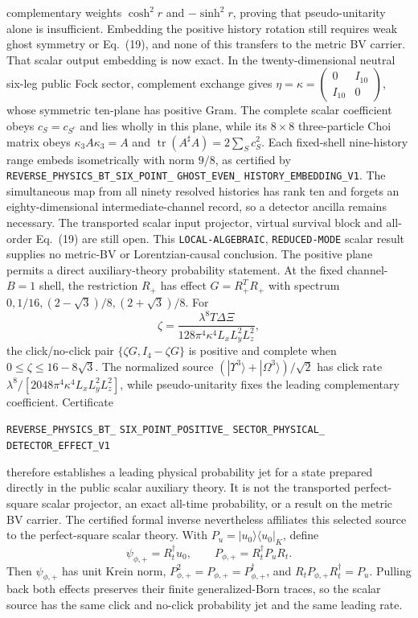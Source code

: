 \documentclass[11pt]{article}
\theoremstyle{definition}
\theoremstyle{remark}
\begin{document}
complementary weights $\cosh^2r$ and $-\sinh^2r$, proving that
pseudo-unitarity alone is insufficient.  Embedding the positive history
rotation still requires weak ghost symmetry or Eq.~(19), and none of this
transfers to the metric BV carrier.
That scalar output embedding is now exact.  In the twenty-dimensional neutral
six-leg public Fock sector, complement exchange gives
\(
\eta=\kappa=\left(\begin{smallmatrix}0&I_{10}\\I_{10}&0\end{smallmatrix}\right)
\), whose symmetric ten-plane has positive Gram.  The complete scalar
coefficient obeys $c_S=c_{S^c}$ and lies wholly in this plane, while its
$8\times8$ three-particle Choi matrix obeys
$\kappa_3A\kappa_3=A$ and
$\operatorname{tr}(A^\sharp A)=2\sum_Sc_S^2$.  Each fixed-shell
nine-history range embeds isometrically with norm $9/8$, as certified by
\texttt{REVERSE\_PHYSICS\_BT\_SIX\_POINT\_}
\allowbreak\texttt{GHOST\_EVEN\_}
\allowbreak\texttt{HISTORY\_EMBEDDING\_V1}.
The simultaneous map from all ninety resolved histories has rank ten and
forgets an eighty-dimensional intermediate-channel record, so a detector
ancilla remains necessary.  The transported scalar input projector, virtual
survival block and all-order Eq.~(19) are still open.  This
\texttt{LOCAL-}\allowbreak\texttt{ALGEBRAIC},
\texttt{REDUCED-}\allowbreak\texttt{MODE} scalar result supplies no
metric-BV or Lorentzian-causal conclusion.
The positive plane permits a direct auxiliary-theory probability statement.
At the fixed channel-$B=1$ shell, the restriction $R_+$ has effect
$G=R_+^TR_+$ with spectrum
$0,1/16,(2-\sqrt3)/8,(2+\sqrt3)/8$.  For
\[
 \zeta=\frac{\lambda^8T\Delta\Xi}
 {128\pi^4\kappa^4L_xL_y^2L_z^2},
\]
the click/no-click pair $\{\zeta G,I_4-\zeta G\}$ is positive and complete
when $0\leq\zeta\leq16-8\sqrt3$.  The normalized source
$(|\Upsilon^3\rangle+|\Omega^3\rangle)/\sqrt2$ has click rate
$\lambda^8/[2048\pi^4\kappa^4L_xL_y^2L_z^2]$, while pseudo-unitarity fixes
the leading complementary coefficient.  Certificate
\par\noindent
\texttt{REVERSE\_PHYSICS\_BT\_}
\allowbreak\texttt{SIX\_POINT\_POSITIVE\_}
\allowbreak\texttt{SECTOR\_PHYSICAL\_}
\allowbreak\texttt{DETECTOR\_EFFECT\_V1}
\par\noindent
therefore establishes a leading physical probability jet for a state prepared
directly in the public scalar auxiliary theory.  It is not the transported
perfect-square scalar projector, an exact all-time probability, or a result
on the metric BV carrier.
The certified formal inverse nevertheless affiliates this selected source to
the perfect-square scalar theory.  With
$P_u=|u_0\rangle\langle u_0|_K$, define
\[
 \psi_{\phi,+}=R_t^\dagger u_0,\qquad
 P_{\phi,+}=R_t^\dagger P_uR_t.
\]
Then $\psi_{\phi,+}$ has unit Krein norm,
$P_{\phi,+}^2=P_{\phi,+}=P_{\phi,+}^\dagger$, and
$R_tP_{\phi,+}R_t^\dagger=P_u$.  Pulling back both effects preserves their
finite generalized-Born traces, so the scalar source has the same click and
no-click probability jet and the same leading rate.
\end{document}

